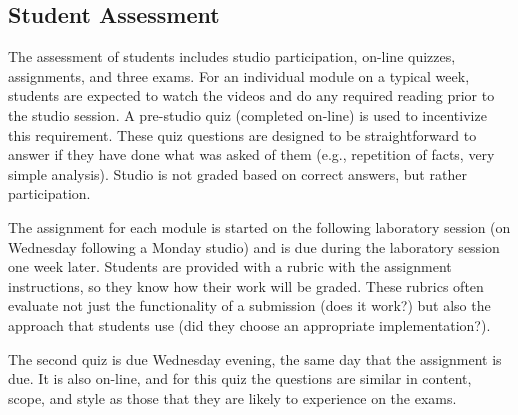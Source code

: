 \subsection{Student Assessment}

The assessment of students includes studio
participation, on-line quizzes, assignments, and three exams.
For an individual module on a typical week,
students are expected to watch the videos
and do any required reading prior to the studio session.
A pre-studio quiz (completed on-line) is used to incentivize this
requirement.  %
These quiz questions are designed to be straightforward to answer if
they have done what was asked of them (e.g., repetition of facts,
very simple analysis).
Studio is not graded based on correct answers, but
rather participation.

The assignment for each module is started on the
following laboratory session (on Wednesday following a Monday studio)
and is due during the laboratory session one week later.
Students are provided with a rubric with the assignment instructions,
so they know how their work will be graded. These rubrics often evaluate
not just the functionality of a submission (does it work?) but also the approach
that students use (did they choose an appropriate implementation?).

The second quiz is due Wednesday evening, the same day that the assignment
is due. It is also on-line, and for this quiz the questions are 
similar in content, scope, and style as those that they are likely to
experience on the exams. 

